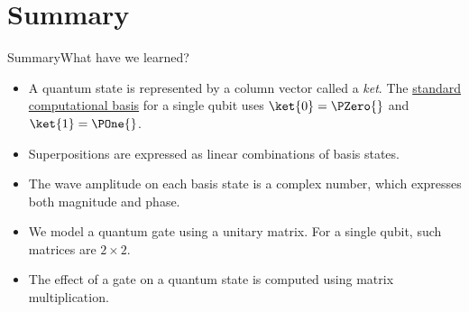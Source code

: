 \section{Summary}
\begin{frame}{Summary}{What have we learned?}
\begin{itemize}
    \item A quantum state is represented by a column vector called a \emph{ket}.  The \href{https://en.wikipedia.org/wiki/Qubit\#Standard_representation}{standard computational basis} for a single qubit uses $\ket{0}=\PZero{}$ and $\ket{1}=\POne{}$.
    \item Superpositions are expressed as linear combinations of basis states.  
    \item The wave amplitude on each basis state is a complex number, which expresses both magnitude and phase.
    \item We model a quantum gate using a unitary matrix.  For a single qubit, such matrices are $2\times 2$.
    \item The effect of a gate on a quantum state is computed using matrix multiplication.
\end{itemize}
    
\end{frame}
